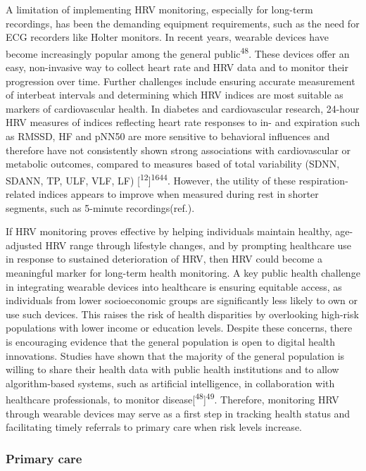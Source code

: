 \documentclass[
  a4paper,
  headsepline=true,
  open=any]{scrbook}
\begin{document}
A limitation of implementing HRV monitoring, especially for long-term
recordings, has been the demanding equipment requirements, such as the
need for ECG recorders like Holter monitors. In recent years, wearable
devices have become increasingly popular among the general
public\textsuperscript{48}. These devices offer an easy, non-invasive
way to collect heart rate and HRV data and to monitor their progression
over time. Further challenges include ensuring accurate measurement of
interbeat intervals and determining which HRV indices are most suitable
as markers of cardiovascular health. In diabetes and cardiovascular
research, 24-hour HRV measures of indices reflecting heart rate
responses to in- and expiration such as RMSSD, HF and pNN50 are more
sensitive to behavioral influences and therefore have not consistently
shown strong associations with cardiovascular or metabolic outcomes,
compared to measures based of total variability (SDNN, SDANN, TP, ULF,
VLF, LF)
{[}\textsuperscript{12}{]}\textsuperscript{16}\textsuperscript{44}.
However, the utility of these respiration-related indices appears to
improve when measured during rest in shorter segments, such as 5-minute
recordings(ref.).

If HRV monitoring proves effective by helping individuals maintain
healthy, age-adjusted HRV range through lifestyle changes, and by
prompting healthcare use in response to sustained deterioration of HRV,
then HRV could become a meaningful marker for long-term health
monitoring. A key public health challenge in integrating wearable
devices into healthcare is ensuring equitable access, as individuals
from lower socioeconomic groups are significantly less likely to own or
use such devices. This raises the risk of health disparities by
overlooking high-risk populations with lower income or education levels.
Despite these concerns, there is encouraging evidence that the general
population is open to digital health innovations. Studies have shown
that the majority of the general population is willing to share their
health data with public health institutions and to allow algorithm-based
systems, such as artificial intelligence, in collaboration with
healthcare professionals, to monitor
disease{[}\textsuperscript{48}{]}\textsuperscript{49}. Therefore,
monitoring HRV through wearable devices may serve as a first step in
tracking health status and facilitating timely referrals to primary care
when risk levels increase.

\hypertarget{primary-care}{%
\subsubsection{Primary care}\label{primary-care}}
\end{document}
